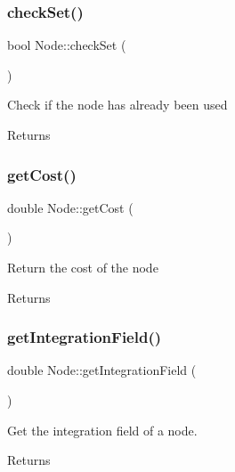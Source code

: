 \subsubsection{\texorpdfstring{checkSet()}{checkSet()}}
{\footnotesize\ttfamily bool Node\+::check\+Set (\begin{DoxyParamCaption}{ }\end{DoxyParamCaption})}



Check if the node has already been used 

\begin{DoxyReturn}{Returns}

\end{DoxyReturn}
\mbox{\label{class_node_a6598ebb34ab252ac0258b32a78f689d0}} 
\subsubsection{\texorpdfstring{getCost()}{getCost()}}
{\footnotesize\ttfamily double Node\+::get\+Cost (\begin{DoxyParamCaption}{ }\end{DoxyParamCaption})}



Return the cost of the node 

\begin{DoxyReturn}{Returns}

\end{DoxyReturn}
\mbox{\label{class_node_a1d3e51a36ef8794ca73d3be104ba792c}} 
\subsubsection{\texorpdfstring{getIntegrationField()}{getIntegrationField()}}
{\footnotesize\ttfamily double Node\+::get\+Integration\+Field (\begin{DoxyParamCaption}{ }\end{DoxyParamCaption})}



Get the integration field of a node. 

\begin{DoxyReturn}{Returns}

\end{DoxyReturn}
\mbox{\label{class_node_a535896357ea40bc56fe4d6aed70b6361}} 
